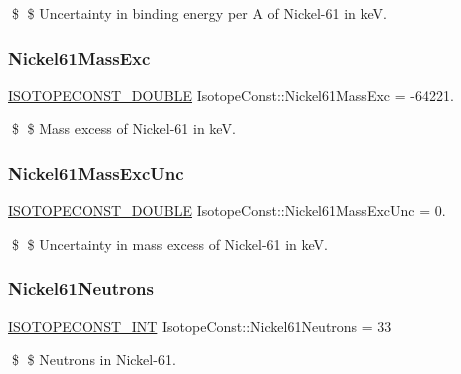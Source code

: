 \$ \$ Uncertainty in binding energy per A of Nickel-\/61 in keV. \mbox{\label{group___isotope_const-_nickel-_ni61_gab00424df13d407456705c28bd3b260bf}} 
\subsubsection{\texorpdfstring{Nickel61\+Mass\+Exc}{Nickel61MassExc}}
{\footnotesize\ttfamily \mbox{\hyperlink{group___isotope_const-_macros_ga8f45a7272ce02c0b4c65c44636ed719a}{I\+S\+O\+T\+O\+P\+E\+C\+O\+N\+S\+T\+\_\+\+D\+O\+U\+B\+LE}} Isotope\+Const\+::\+Nickel61\+Mass\+Exc = -\/64221.}

\$ \$ Mass excess of Nickel-\/61 in keV. \mbox{\label{group___isotope_const-_nickel-_ni61_gaa32318b69b0a60969de7dc98a803461f}} 
\subsubsection{\texorpdfstring{Nickel61\+Mass\+Exc\+Unc}{Nickel61MassExcUnc}}
{\footnotesize\ttfamily \mbox{\hyperlink{group___isotope_const-_macros_ga8f45a7272ce02c0b4c65c44636ed719a}{I\+S\+O\+T\+O\+P\+E\+C\+O\+N\+S\+T\+\_\+\+D\+O\+U\+B\+LE}} Isotope\+Const\+::\+Nickel61\+Mass\+Exc\+Unc = 0.}

\$ \$ Uncertainty in mass excess of Nickel-\/61 in keV. \mbox{\label{group___isotope_const-_nickel-_ni61_ga8626dd87891448168f6805414d50f250}} 
\subsubsection{\texorpdfstring{Nickel61\+Neutrons}{Nickel61Neutrons}}
{\footnotesize\ttfamily \mbox{\hyperlink{group___isotope_const-_macros_ga5f18360b3e99483a35c32d789e62621c}{I\+S\+O\+T\+O\+P\+E\+C\+O\+N\+S\+T\+\_\+\+I\+NT}} Isotope\+Const\+::\+Nickel61\+Neutrons = 33}

\$ \$ Neutrons in Nickel-\/61. \mbox{\label{group___isotope_const-_nickel-_ni61_ga3412e2c2ba4c86a214d26d09ac66b1a2}} 
